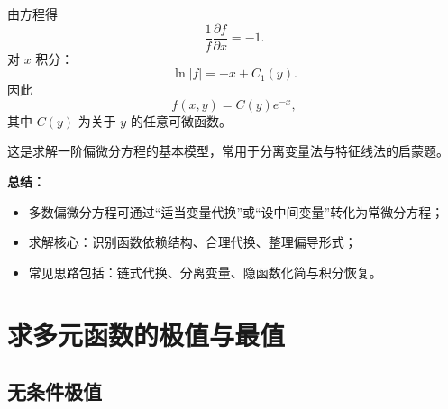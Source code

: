 \begin{enumerate}
          \begin{solution}
              由方程得
              \[
                  \frac{1}{f}\frac{\partial f}{\partial x} = -1.
              \]
              对 $x$ 积分：
              \[
                  \ln|f| = -x + C_1(y).
              \]
              因此
              \[
                  f(x,y) = C(y)e^{-x},
              \]
              其中 $C(y)$ 为关于 $y$ 的任意可微函数。
          \end{solution}

          这是求解一阶偏微分方程的基本模型，常用于分离变量法与特征线法的启蒙题。
\end{enumerate}

\textbf{总结：}
\begin{itemize}
    \item 多数偏微分方程可通过“适当变量代换”或“设中间变量”转化为常微分方程；
    \item 求解核心：识别函数依赖结构、合理代换、整理偏导形式；
    \item 常见思路包括：链式代换、分离变量、隐函数化简与积分恢复。
\end{itemize}

\section{求多元函数的极值与最值}

\subsection{无条件极值}

